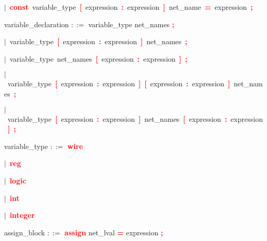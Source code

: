 \mbox{$|$ \textbf{\textcolor{red}{const}} variable\_type \textbf{\textcolor{red}{[}} expression \textbf{\textcolor{red}{:}} expression \textbf{\textcolor{red}{]}} net\_name \textbf{\textcolor{red}{=}} expression \textbf{\textcolor{red}{;}}}

\vspace{1em}
\noindent
\settowidth{\parindent}{\hspace{4ex}}
variable\_declaration $::=$\hspace{1ex} variable\_type net\_names \textbf{\textcolor{red}{;}}

\mbox{$|$ variable\_type \textbf{\textcolor{red}{[}} expression \textbf{\textcolor{red}{:}} expression \textbf{\textcolor{red}{]}} net\_names \textbf{\textcolor{red}{;}}}

\mbox{$|$ variable\_type net\_names \textbf{\textcolor{red}{[}} expression \textbf{\textcolor{red}{:}} expression \textbf{\textcolor{red}{]}} \textbf{\textcolor{red}{;}}}

\mbox{$|$ variable\_type \textbf{\textcolor{red}{[}} expression \textbf{\textcolor{red}{:}} expression \textbf{\textcolor{red}{]}} \textbf{\textcolor{red}{[}} expression \textbf{\textcolor{red}{:}} expression \textbf{\textcolor{red}{]}} net\_names \textbf{\textcolor{red}{;}}}

\mbox{$|$ variable\_type \textbf{\textcolor{red}{[}} expression \textbf{\textcolor{red}{:}} expression \textbf{\textcolor{red}{]}} net\_names \textbf{\textcolor{red}{[}} expression \textbf{\textcolor{red}{:}} expression \textbf{\textcolor{red}{]}} \textbf{\textcolor{red}{;}}}

\vspace{1em}
\noindent
\settowidth{\parindent}{\hspace{4ex}}
variable\_type $::=$\hspace{1ex} \textbf{\textcolor{red}{wire}}

\mbox{$|$ \textbf{\textcolor{red}{reg}}}

\mbox{$|$ \textbf{\textcolor{red}{logic}}}

\mbox{$|$ \textbf{\textcolor{red}{int}}}

\mbox{$|$ \textbf{\textcolor{red}{integer}}}

\vspace{1em}
\noindent
\settowidth{\parindent}{\hspace{4ex}}
assign\_block $::=$\hspace{1ex} \textbf{\textcolor{red}{assign}} net\_lval \textbf{\textcolor{red}{=}} expression \textbf{\textcolor{red}{;}}

